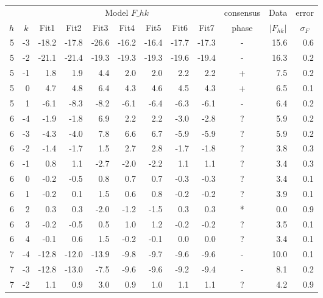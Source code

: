 \begin{table}[htbp]
\centering
\begin{tabular}{rrrrrrrrrcrr}
\hline
& & \multicolumn{7}{c}{Model $F\_{hk}$} & consensus & \multicolumn{1}{c}{Data} & \multicolumn{1}{c}{error} \\
\cline{3-9}
\multicolumn{1}{c}{$h$} & \multicolumn{1}{c}{$k$} & \multicolumn{1}{c}{Fit1} & \multicolumn{1}{c}{Fit2} & \multicolumn{1}{c}{Fit3} & \multicolumn{1}{c}{Fit4} & \multicolumn{1}{c}{Fit5} & \multicolumn{1}{c}{Fit6} & \multicolumn{1}{c}{Fit7} & phase & \multicolumn{1}{c}{$\left|F_{hk}\right|$} & \multicolumn{1}{c}{$\sigma_F$} \\ 
\hline
5 & -3 & -18.2 & -17.8 & -26.6 & -16.2 & -16.4 & -17.7 & -17.3 & - & 15.6 & 0.6 \\ 
5 & -2 & -21.1 & -21.4 & -19.3 & -19.3 & -19.3 & -19.6 & -19.4 & - & 16.3 & 0.2 \\ 
5 & -1 & 1.8 & 1.9 & 4.4 & 2.0 & 2.0 & 2.2 & 2.2 & + & 7.5 & 0.2 \\ 
5 & 0 & 4.7 & 4.8 & 6.4 & 4.3 & 4.6 & 4.5 & 4.3 & + & 6.5 & 0.1 \\ 
5 & 1 & -6.1 & -8.3 & -8.2 & -6.1 & -6.4 & -6.3 & -6.1 & - & 6.4 & 0.2 \\ 
6 & -4 & -1.9 & -1.8 & 6.9 & 2.2 & 2.2 & -3.0 & -2.8 & ? & 5.9 & 0.2 \\ 
6 & -3 & -4.3 & -4.0 & 7.8 & 6.6 & 6.7 & -5.9 & -5.9 & ? & 5.9 & 0.2 \\ 
6 & -2 & -1.4 & -1.7 & 1.5 & 2.7 & 2.8 & -1.7 & -1.8 & ? & 3.8 & 0.3 \\ 
6 & -1 & 0.8 & 1.1 & -2.7 & -2.0 & -2.2 & 1.1 & 1.1 & ? & 3.4 & 0.3 \\ 
6 & 0 & -0.2 & -0.5 & 0.8 & 0.7 & 0.7 & -0.3 & -0.3 & ? & 3.4 & 0.1 \\ 
6 & 1 & -0.2 & 0.1 & 1.5 & 0.6 & 0.8 & -0.2 & -0.2 & ? & 3.9 & 0.1 \\ 
6 & 2 & 0.3 & 0.3 & -2.0 & -1.2 & -1.5 & 0.3 & 0.3 & * & 0.0 & 0.9 \\ 
6 & 3 & -0.2 & -0.5 & 0.5 & 1.0 & 1.2 & -0.2 & -0.2 & ? & 3.5 & 0.1 \\ 
6 & 4 & -0.1 & 0.6 & 1.5 & -0.2 & -0.1 & 0.0 & 0.0 & ? & 3.4 & 0.1 \\ 
7 & -4 & -12.8 & -12.0 & -13.9 & -9.8 & -9.7 & -9.6 & -9.6 & - & 10.0 & 0.1 \\ 
7 & -3 & -12.8 & -13.0 & -7.5 & -9.6 & -9.6 & -9.2 & -9.4 & - & 8.1 & 0.2 \\ 
7 & -2 & 1.1 & 0.9 & 3.0 & 0.9 & 1.0 & 1.1 & 1.1 & ? & 4.2 & 0.9 \\ 

\end{tabular}
\end{table}
